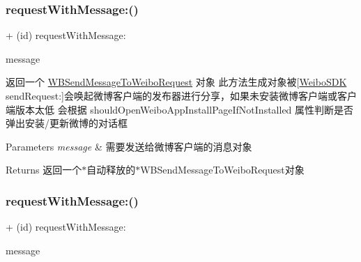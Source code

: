 \subsubsection{\texorpdfstring{request\+With\+Message\+:()}{requestWithMessage:()}\hspace{0.1cm}{\footnotesize\ttfamily [1/3]}}
{\footnotesize\ttfamily + (id) request\+With\+Message\+: \begin{DoxyParamCaption}\item[{(\mbox{\hyperlink{interface_w_b_message_object}{W\+B\+Message\+Object}} $\ast$)}]{message }\end{DoxyParamCaption}}

返回一个 \mbox{\hyperlink{interface_w_b_send_message_to_weibo_request}{W\+B\+Send\+Message\+To\+Weibo\+Request}} 对象 此方法生成对象被\mbox{[}\mbox{\hyperlink{interface_weibo_s_d_k}{Weibo\+S\+DK}} send\+Request\+:\mbox{]}会唤起微博客户端的发布器进行分享，如果未安装微博客户端或客户端版本太低 会根据 should\+Open\+Weibo\+App\+Install\+Page\+If\+Not\+Installed 属性判断是否弹出安装/更新微博的对话框 
\begin{DoxyParams}{Parameters}
{\em message} & 需要发送给微博客户端的消息对象 \\
\hline
\end{DoxyParams}
\begin{DoxyReturn}{Returns}
返回一个$\ast$自动释放的$\ast$\+W\+B\+Send\+Message\+To\+Weibo\+Request对象 
\end{DoxyReturn}
\mbox{\label{interface_w_b_send_message_to_weibo_request_af6ff893011c578e7351d4f35b542fb41}} 
\subsubsection{\texorpdfstring{request\+With\+Message\+:()}{requestWithMessage:()}\hspace{0.1cm}{\footnotesize\ttfamily [2/3]}}
{\footnotesize\ttfamily + (id) request\+With\+Message\+: \begin{DoxyParamCaption}\item[{(\mbox{\hyperlink{interface_w_b_message_object}{W\+B\+Message\+Object}} $\ast$)}]{message }\end{DoxyParamCaption}}


